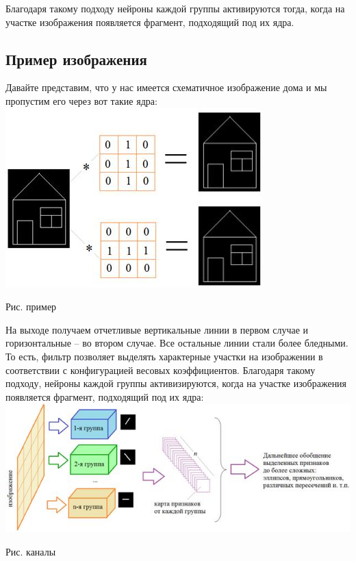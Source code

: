 \documentclass{article}
\begin{document}
	Благодаря такому подходу нейроны каждой группы активируются тогда, когда на участке изображения появляется фрагмент, подходящий под их ядра.
	
	\subsection{Пример изображения}
	
	Давайте представим, что у нас имеется схематичное изображение дома и мы пропустим его через вот такие ядра:\\
	
	\noindent \includegraphics[width=\textwidth]{pic4.jpg}
	\begin{center}
		Рис. пример
	\end{center}
	
	На выходе получаем отчетливые вертикальные линии в первом случае и горизонтальные – во втором случае. Все остальные линии стали более бледными. То есть, фильтр позволяет выделять характерные участки на изображении в соответствии с конфигурацией весовых коэффициентов. Благодаря такому подходу, нейроны каждой группы активизируются, когда на участке изображения появляется фрагмент, подходящий под их ядра:\\
	
	\noindent \includegraphics[width=\textwidth]{pic5.jpg}
	\begin{center}
		Рис. каналы
	\end{center}
\end{document}
